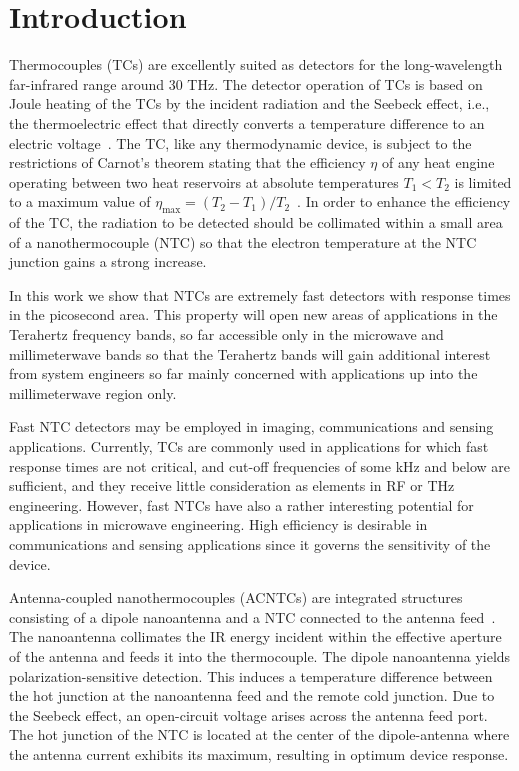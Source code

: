 \documentclass[journal]{IEEEtran}
\begin{document}
\section{Introduction}\label{Introduction}
%
%
Thermocouples (TCs) are excellently suited as detectors for the long-wavelength far-infrared range around 30 THz. The detector operation of TCs is based on Joule heating of the TCs by the incident radiation and the Seebeck effect, i.e., the thermoelectric effect that directly converts a temperature difference to an electric voltage~\cite{mott_theory_1936,bakker_nanoscale_2012}.  The TC, like any thermodynamic device, is subject to the restrictions of Carnot's theorem stating that the efficiency $\eta$ of any heat engine operating between two heat reservoirs at absolute temperatures $T_1 < T_2$ is limited to a maximum value of $\eta_\mathrm{max} = (T_2-T_1)/T_2$~\cite{agrawal_thermoelectric_1997}. In order to enhance the efficiency of the TC, the radiation to be detected should be collimated within a small area of a nanothermocouple (NTC) so that the electron temperature at the NTC junction gains a strong increase. 

In this work we show that NTCs are extremely fast detectors with response times in the picosecond area. This property will open new areas of applications in the Terahertz frequency bands, so far accessible only in the microwave and millimeterwave bands so that the Terahertz bands will gain additional interest from system engineers so far mainly concerned with applications up into the millimeterwave region only.

Fast NTC detectors may be employed in imaging, communications and sensing applications. Currently, TCs are commonly used in applications for which fast response times are not critical, and cut-off frequencies of some kHz and below are sufficient, and they receive little consideration as elements in RF or THz engineering. However, fast NTCs have also a rather interesting potential for applications in microwave engineering. High efficiency is desirable in communications and sensing applications since it governs the sensitivity of the device.

Antenna-coupled nanothermocouples (ACNTCs) are integrated structures consisting of a dipole nanoantenna and a NTC connected to the antenna feed~\cite{szakmany_antenna_2013}. The nanoantenna collimates the IR energy incident within the effective aperture of the antenna and feeds it into the thermocouple. The dipole nanoantenna yields polarization-sensitive detection. This induces  a temperature difference between the hot junction at the nanoantenna feed  and the remote cold junction. Due to the Seebeck effect, an  open-circuit voltage arises across the antenna feed port. The hot junction of the NTC is located at the center of the dipole-antenna where the antenna current exhibits its maximum, resulting in optimum device response. 
\end{document}
